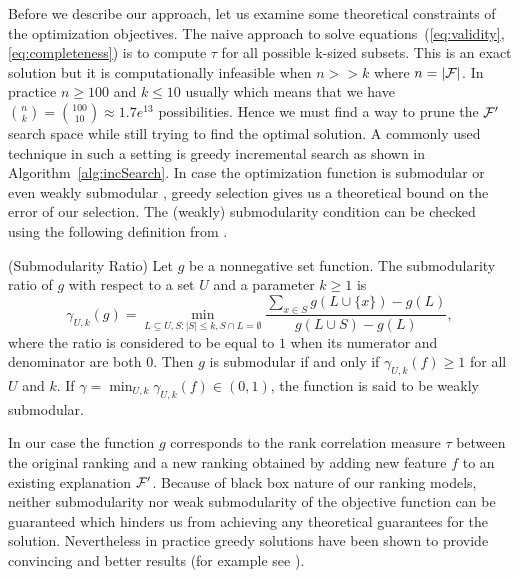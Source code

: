  Before we describe our approach, let us examine some theoretical constraints of the optimization objectives. The naive approach to solve equations~(\ref{eq:validity},\ref{eq:completeness}) is to compute $\tau$ for all possible k-sized subsets. This is an exact solution but it is computationally infeasible when $n >> k$ where $n=|\mathcal{F}|$. In practice $n \geq 100$ and $k \leq 10$ usually which means that we have ${n \choose k} = {100 \choose 10} \approx 1.7e^{13}$ possibilities. Hence we must find a way to prune the $\mathcal{F}'$ search space while still trying to find the optimal solution. A commonly used technique in such a setting is greedy incremental search as shown in Algorithm~\ref{alg:incSearch}. In case the optimization function  is  submodular or even weakly submodular \cite{submodularity2011}, greedy selection gives us a theoretical bound on the error of our selection. The (weakly) submodularity condition can be checked using the following definition from \cite{submodularity2011}.
\begin{definition}(Submodularity Ratio) Let $g$ be a nonnegative set function. The submodularity ratio of $g$ with respect to a set $U$ and a parameter $k \geq 1$ is $$\gamma_{U, k}(g)=\min _{L \subseteq U, S:|S| \leq k, S \cap L=\emptyset} \frac{\sum_{x \in S} g(L \cup\{x\})-g(L)}{g(L \cup S)-g(L)},$$
where the ratio is considered to be equal to $1$
when its numerator and denominator are both
$0$. Then $g$ is submodular if and only if $\gamma_{U, k}(f)\ge 1$ for all $U$ and $k$. If $\gamma = \min_{U,k} \gamma_{U, k}(f) \in (0,1)$, the function is said to be weakly submodular.
\end{definition}
In our case the function $g$ corresponds to the rank correlation measure $\tau$ between the original ranking and a new ranking obtained by adding new feature $f$ to an existing explanation $\mathcal{F}'$. Because of black box nature of our ranking models, neither submodularity nor weak submodularity of the objective function can be guaranteed which hinders us from achieving any theoretical guarantees for the solution. Nevertheless in practice greedy solutions have been shown to provide convincing and better results (for example see \cite{streamweaksub2017}).




